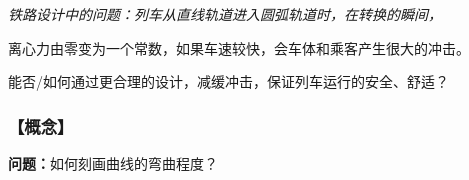 \begin{center}
	
	{\it 铁路设计中的问题：列车从直线轨道进入圆弧轨道时，在转换的瞬间，
	
	离心力由零变为一个常数，如果车速较快，会车体和乘客产生很大的冲击。
	
	能否/如何通过更合理的设计，减缓冲击，保证列车运行的安全、舒适？}
\end{center}

\subsubsection{【概念】}

{\bf 问题：}如何刻画曲线的弯曲程度？

